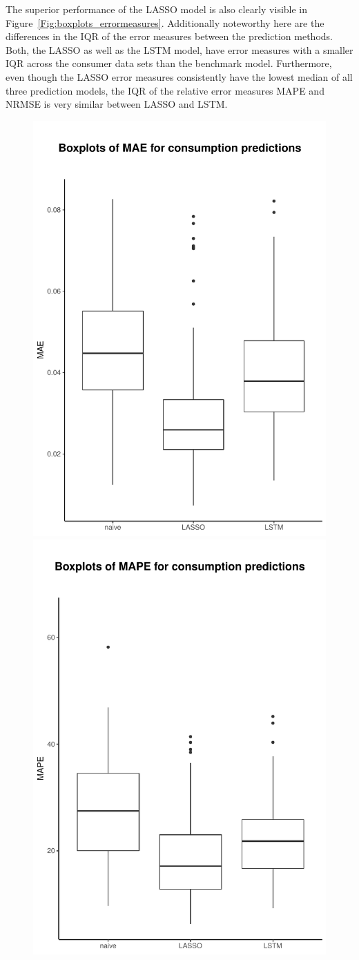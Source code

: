 \newpage
The superior performance of the LASSO model is also clearly visible in Figure~\ref{Fig:boxplots_errormeasures}. Additionally noteworthy here are the differences in the IQR of the error measures between the prediction methods. Both, the LASSO as well as the LSTM model, have error measures with a smaller IQR across the consumer data sets than the benchmark model. Furthermore, even though the LASSO error measures consistently have the lowest median of all three prediction models, the IQR of the relative error measures MAPE and NRMSE is very similar between LASSO and LSTM.
%
\begin{figure}
    \centering
    \includegraphics[width=.5\textwidth-5pt]{thesis/graphs/evaluation/c_boxplot_MAE.pdf}
    \includegraphics[width=.5\textwidth-5pt]{thesis/graphs/evaluation/c_boxplot_MAPE.pdf} \\
    

\end{figure}
